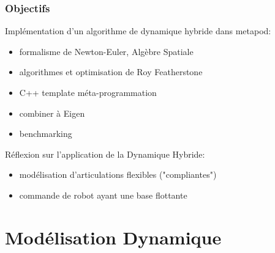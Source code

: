 \documentclass[10pt]{beamer}
\begin{document}
\begin{frame}
  \frametitle{Objectifs}
  
  \begin{block}{Implémentation d'un algorithme de dynamique hybride dans metapod:}
	\begin{itemize}
		\item formalisme de Newton-Euler, Algèbre Spatiale
		\item algorithmes et optimisation de Roy Featherstone
		\item C++ template méta-programmation
		\item combiner à Eigen 
		\item benchmarking
  \end{itemize}
  \end{block}
	
	\bigskip
  Réflexion sur l'application de la Dynamique Hybride:
  	\begin{itemize}
		\item modélisation d'articulations flexibles ("compliantes")
		\item commande de robot ayant une base flottante
  \end{itemize}
	
\end{frame}

\section{Modélisation Dynamique}
\end{document}

